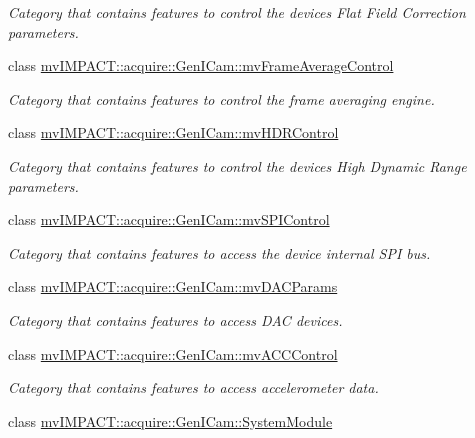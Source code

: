 \begin{DoxyCompactItemize}
\begin{DoxyCompactList}\small\item\em Category that contains features to control the devices Flat Field Correction parameters. \end{DoxyCompactList}\item 
class \hyperlink{classmv_i_m_p_a_c_t_1_1acquire_1_1_gen_i_cam_1_1mv_frame_average_control}{mv\+I\+M\+P\+A\+C\+T\+::acquire\+::\+Gen\+I\+Cam\+::mv\+Frame\+Average\+Control}
\begin{DoxyCompactList}\small\item\em Category that contains features to control the frame averaging engine. \end{DoxyCompactList}\item 
class \hyperlink{classmv_i_m_p_a_c_t_1_1acquire_1_1_gen_i_cam_1_1mv_h_d_r_control}{mv\+I\+M\+P\+A\+C\+T\+::acquire\+::\+Gen\+I\+Cam\+::mv\+H\+D\+R\+Control}
\begin{DoxyCompactList}\small\item\em Category that contains features to control the devices High Dynamic Range parameters. \end{DoxyCompactList}\item 
class \hyperlink{classmv_i_m_p_a_c_t_1_1acquire_1_1_gen_i_cam_1_1mv_s_p_i_control}{mv\+I\+M\+P\+A\+C\+T\+::acquire\+::\+Gen\+I\+Cam\+::mv\+S\+P\+I\+Control}
\begin{DoxyCompactList}\small\item\em Category that contains features to access the device internal S\+P\+I bus. \end{DoxyCompactList}\item 
class \hyperlink{classmv_i_m_p_a_c_t_1_1acquire_1_1_gen_i_cam_1_1mv_d_a_c_params}{mv\+I\+M\+P\+A\+C\+T\+::acquire\+::\+Gen\+I\+Cam\+::mv\+D\+A\+C\+Params}
\begin{DoxyCompactList}\small\item\em Category that contains features to access D\+A\+C devices. \end{DoxyCompactList}\item 
class \hyperlink{classmv_i_m_p_a_c_t_1_1acquire_1_1_gen_i_cam_1_1mv_a_c_c_control}{mv\+I\+M\+P\+A\+C\+T\+::acquire\+::\+Gen\+I\+Cam\+::mv\+A\+C\+C\+Control}
\begin{DoxyCompactList}\small\item\em Category that contains features to access accelerometer data. \end{DoxyCompactList}\item 
class \hyperlink{classmv_i_m_p_a_c_t_1_1acquire_1_1_gen_i_cam_1_1_system_module}{mv\+I\+M\+P\+A\+C\+T\+::acquire\+::\+Gen\+I\+Cam\+::\+System\+Module}

\end{DoxyCompactItemize}
